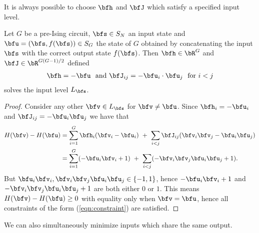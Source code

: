 \documentclass[raggedright, nofonts, notitlepage, openany, debug]{tufte-book}
\begin{document}
It is always possible to choose $\bfh$ and $\bfJ$ which satisfy a specified input level.
\begin{prop}\label{prop:pvec-solves-input-level}
  Let $G$ be a pre-Ising circuit, $\bfs \in S_N$ an input state and $\bfu = (\bfs,f(\bfs)) \in S_G$ the state of $G$ obtained by concatenating the input $\bfs$ with the correct output state $f(\bfs)$. Then $\bfh \in \bR^G$ and $\bfJ \in \bR^{G(G-1)/2}$ defined
  \begin{align*}
    \bfh = - \bfu ~\text{ and } \bfJ_{ij} = -\bfu_i\cdot \bfu_j ~\text{ for } i < j
  \end{align*}
  solves the input level $L_\bfs$.
\end{prop}
\begin{proof}
  Consider any other $\bfv \in L_\bfs$ for $\bfv \neq \bfu$. Since $\bfh_i = -\bfu_i$ and $\bfJ_{ij} = -\bfu_i\bfu_j$ we have that
  \begin{align*}
    H(\bfv) - H(\bfu) 
      &= \sum_{i=1}^G \bfh_i(\bfv_i - \bfu_i) ~+~ \sum_{i < j} \bfJ_{ij}(\bfv_i\bfv_j - \bfu_i\bfu_j) \\
      &= \sum_{i=1}^G (-\bfu_i\bfv_i + 1) ~+~ \sum_{i < j} (-\bfv_i\bfv_j\bfu_i\bfu_j + 1).
  \end{align*}
  But $\bfu_i\bfv_i, \bfv_i\bfv_j\bfu_i\bfu_j \in \{-1,1\}$, hence $-\bfu_i\bfv_i + 1$ and $-\bfv_i\bfv_j\bfu_i\bfu_j + 1$ are both either $0$ or $1$. This means $H(\bfv) - H(\bfu)\geq 0$ with equality only when $\bfv = \bfu$, hence all constraints of the form (\ref{eqn:constraint}) are satisfied.
\end{proof}
We can also simultaneously minimize inputs which share the same output.
\end{document}
